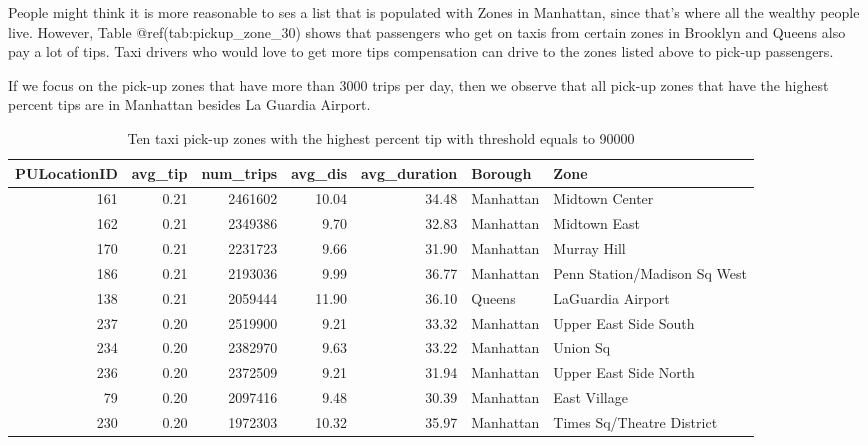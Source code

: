 \documentclass[12pt,twoside]{reedthesis}
\newenvironment{Shaded}{\begin{snugshade}}{\end{snugshade}}
\newcommand{\KeywordTok}[1]{\textcolor[rgb]{0.13,0.29,0.53}{\textbf{#1}}}
\newcommand{\DecValTok}[1]{\textcolor[rgb]{0.00,0.00,0.81}{#1}}
\newcommand{\StringTok}[1]{\textcolor[rgb]{0.31,0.60,0.02}{#1}}
\newcommand{\OperatorTok}[1]{\textcolor[rgb]{0.81,0.36,0.00}{\textbf{#1}}}
\newcommand{\NormalTok}[1]{#1}
\theoremstyle{definition}
\theoremstyle{definition}
\theoremstyle{definition}
\theoremstyle{remark}
\begin{document}
People might think it is more reasonable to ses a list that is populated
with Zones in Manhattan, since that's where all the wealthy people live.
However, Table @ref(tab:pickup\_zone\_30) shows that passengers who get
on taxis from certain zones in Brooklyn and Queens also pay a lot of
tips. Taxi drivers who would love to get more tips compensation can
drive to the zones listed above to pick-up passengers.

If we focus on the pick-up zones that have more than 3000 trips per day,
then we observe that all pick-up zones that have the highest percent
tips are in Manhattan besides La Guardia Airport.
\begin{Shaded}
\end{Shaded}
\begin{table}

\caption{\label{tab:unnamed-chunk-36}Ten taxi pick-up zones with the highest percent tip with threshold equals to 90000}
\centering
\begin{tabular}[t]{r|r|r|r|r|l|l}
\hline
PULocationID & avg\_tip & num\_trips & avg\_dis & avg\_duration & Borough & Zone\\
\hline
161 & 0.21 & 2461602 & 10.04 & 34.48 & Manhattan & Midtown Center\\
\hline
162 & 0.21 & 2349386 & 9.70 & 32.83 & Manhattan & Midtown East\\
\hline
170 & 0.21 & 2231723 & 9.66 & 31.90 & Manhattan & Murray Hill\\
\hline
186 & 0.21 & 2193036 & 9.99 & 36.77 & Manhattan & Penn Station/Madison Sq West\\
\hline
138 & 0.21 & 2059444 & 11.90 & 36.10 & Queens & LaGuardia Airport\\
\hline
237 & 0.20 & 2519900 & 9.21 & 33.32 & Manhattan & Upper East Side South\\
\hline
234 & 0.20 & 2382970 & 9.63 & 33.22 & Manhattan & Union Sq\\
\hline
236 & 0.20 & 2372509 & 9.21 & 31.94 & Manhattan & Upper East Side North\\
\hline
79 & 0.20 & 2097416 & 9.48 & 30.39 & Manhattan & East Village\\
\hline
230 & 0.20 & 1972303 & 10.32 & 35.97 & Manhattan & Times Sq/Theatre District\\
\hline
\end{tabular}
\end{table}
\end{document}
